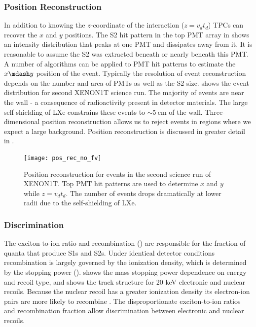 \subsubsection{Position Reconstruction}
\label{subsubsec:tpcs_signals_posrec}
In addition to knowing the $z$-coordinate of the interaction ($z = v_{d} t_{d}$) TPCs can recover the $x$ and $y$ positions.  The S2
hit pattern in the top PMT array in  shows an intensity distribution that peaks at one
PMT and dissipates away from it.  It is reasonable to assume the S2 was extracted beneath or nearly beneath this PMT.  A number of
algorithms can be applied to PMT hit patterns to estimate the $x \mdash y$ position of the event.  Typically the resolution of event
reconstruction depends on the number and area of PMTs as well as the S2 size.   shows the event
distribution for second XENON1T science run.  The majority of events are near the wall - a consequence of
radioactivity present in detector materials.  The large self-shielding of LXe constrains these events to ${\sim}5\ \mathrm{cm}$ of the
wall.  Three-dimensional position reconstruction allows us to reject events in regions where we
expect a large background.  Position reconstruction is discussed in greater detail in
.

\begin{figure}
\centering
\texttt{[image: pos\_rec\_no\_fv]}
\caption{Position reconstruction for events in the second science run of XENON1T.  Top PMT hit patterns are used to determine $x$ and $y$
while $z = v_{d} t_{d}$.  The number of events drops dramatically at lower radii due to the self-shielding of LXe.}
\label{fig:tpcs_signal_tpc}
\end{figure}



\subsubsection{Discrimination}
\label{subsubsec:tpcs_signals_discr}
The exciton-to-ion ratio and recombination () are responsible for the fraction of quanta that produce S1s
and S2s.  Under identical
detector conditions recombination is largely governed by the ionization density, which is determined by the stopping power
().   shows the mass stopping power dependence on energy and recoil type,
and  shows the track structure for 20 keV electronic and nuclear recoils.  Because the nuclear recoil has
a greater ionization density its electron-ion pairs are more likely to recombine .  The disproportionate exciton-to-ion
ratios and recombination fraction allow discrimination between electronic and nuclear recoils.

